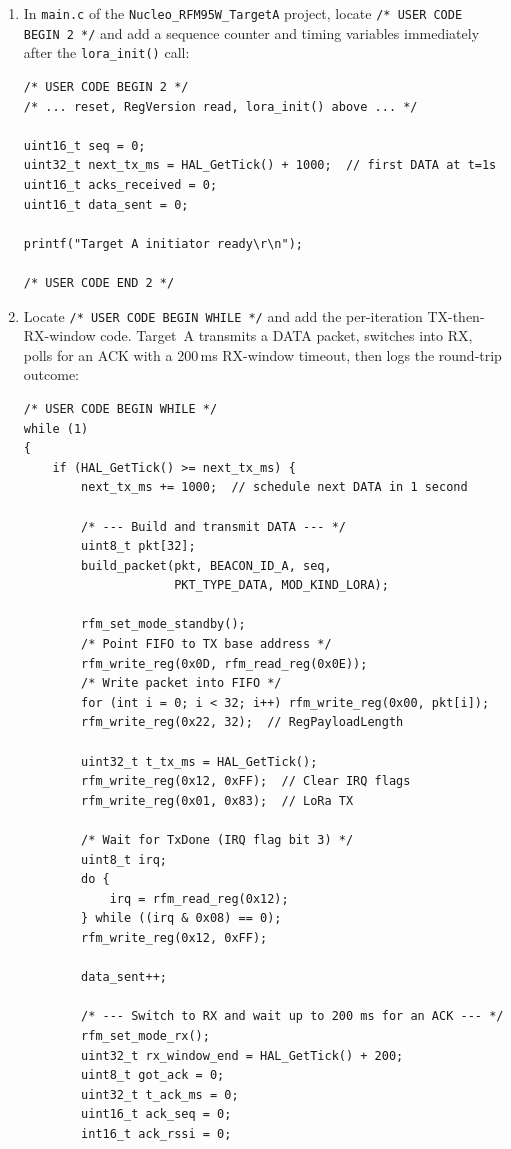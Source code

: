 \documentclass[11pt,letterpaper]{article}
\begin{document}
\begin{enumerate}[leftmargin=2em]
	\item In \texttt{main.c} of the \texttt{Nucleo\_RFM95W\_TargetA} project, locate \texttt{/* USER CODE BEGIN 2 */} and add a sequence counter and timing variables immediately after the \texttt{lora\_init()} call:
\begin{verbatim}
/* USER CODE BEGIN 2 */
/* ... reset, RegVersion read, lora_init() above ... */

uint16_t seq = 0;
uint32_t next_tx_ms = HAL_GetTick() + 1000;  // first DATA at t=1s
uint16_t acks_received = 0;
uint16_t data_sent = 0;

printf("Target A initiator ready\r\n");

/* USER CODE END 2 */
\end{verbatim}

	\item Locate \texttt{/* USER CODE BEGIN WHILE */} and add the per-iteration TX-then-RX-window code. Target~A transmits a DATA packet, switches into RX, polls for an ACK with a 200\,ms RX-window timeout, then logs the round-trip outcome:
\begin{verbatim}
/* USER CODE BEGIN WHILE */
while (1)
{
    if (HAL_GetTick() >= next_tx_ms) {
        next_tx_ms += 1000;  // schedule next DATA in 1 second

        /* --- Build and transmit DATA --- */
        uint8_t pkt[32];
        build_packet(pkt, BEACON_ID_A, seq,
                     PKT_TYPE_DATA, MOD_KIND_LORA);

        rfm_set_mode_standby();
        /* Point FIFO to TX base address */
        rfm_write_reg(0x0D, rfm_read_reg(0x0E));
        /* Write packet into FIFO */
        for (int i = 0; i < 32; i++) rfm_write_reg(0x00, pkt[i]);
        rfm_write_reg(0x22, 32);  // RegPayloadLength

        uint32_t t_tx_ms = HAL_GetTick();
        rfm_write_reg(0x12, 0xFF);  // Clear IRQ flags
        rfm_write_reg(0x01, 0x83);  // LoRa TX

        /* Wait for TxDone (IRQ flag bit 3) */
        uint8_t irq;
        do {
            irq = rfm_read_reg(0x12);
        } while ((irq & 0x08) == 0);
        rfm_write_reg(0x12, 0xFF);

        data_sent++;

        /* --- Switch to RX and wait up to 200 ms for an ACK --- */
        rfm_set_mode_rx();
        uint32_t rx_window_end = HAL_GetTick() + 200;
        uint8_t got_ack = 0;
        uint32_t t_ack_ms = 0;
        uint16_t ack_seq = 0;
        int16_t ack_rssi = 0;


\end{verbatim}
\end{enumerate}
\end{document}
